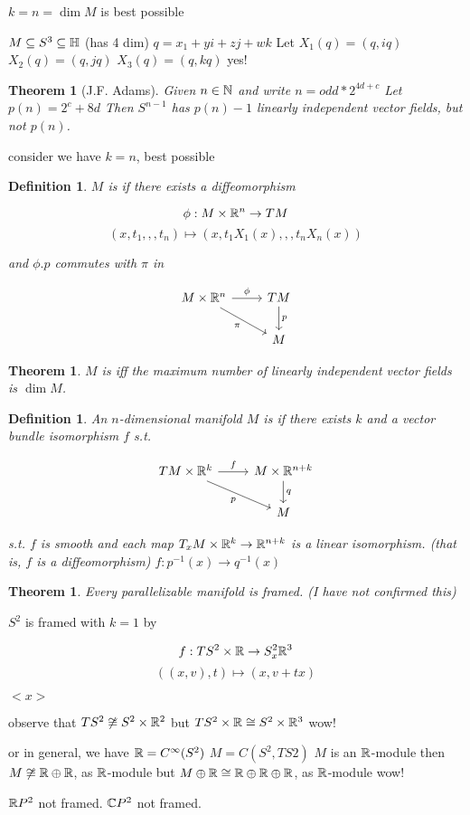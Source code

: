 \documentclass[11pt]{amsbook}
\theoremstyle{mystyle} \newtheorem{thrm}[thm]{Theorem}
\theoremstyle{mystyle} \newtheorem{defi}[thm]{Definition}
\theoremstyle{mystyle} \newtheorem{coro}[thm]{Corollary}
\theoremstyle{mystyle} \newtheorem{propo}[thm]{Proposition}
\theoremstyle{mystyle} \newtheorem{lemm}[thm]{Lemma}
\numberwithin{thm}{section}
\newcommand{\x}{\times}
\begin{document}
$k = n = \dim M$ is best possible

\begin{example}
	$M \subseteq S^3 \subseteq {\mathbb H}$ (has 4 dim)
	$q = x_1 + yi + zj + wk$
	Let
	$X_1(q) = (q, iq)$
	$X_2(q) = (q, jq)$
	$X_3(q) = (q, kq)$
	yes!
\end{example}
\begin{thrm}[J.F. Adams]
	Given $n \in {\mathbb N}$ and write $n = odd*2^{4d+c}$
	Let $p(n) = 2^c + 8d$
	Then $S^{n-1}$ has $p(n)-1$ linearly independent vector fields, but not $p(n)$.
\end{thrm}

consider we have $k = n$, best possible


\begin{defi}
	$M$ is  if there exists a diffeomorphism

	$$\phi : M \x \R^n \to TM$$
	$$(x, t_1,,,t_n) \mapsto (x, t_1X_1(x),,,t_nX_n(x))$$

	and $\phi.p$ commutes with $\pi$ in

	$$\begin{tikzcd}
		M \x \R^n \arrow[r, "\phi"] \arrow[rd, "\pi"'] & TM \arrow[d, "p"] \\
		 & M
	\end{tikzcd}$$

\end{defi}
\begin{thrm}
	$M$ is  iff the maximum number of linearly independent vector fields is $\dim M$.
\end{thrm}
\begin{defi}
	An $n$-dimensional manifold $M$ is  if there exists $k$ and a vector bundle isomorphism $f$ s.t.

	$$\begin{tikzcd}
		TM \x \R^k \arrow[r, "f"] \arrow[rd, "p"'] & M \x \R^{n+k} \arrow[d, "q"] \\
				   & M
	\end{tikzcd}$$

	s.t. $f$ is smooth and each map $T_xM \x \R^k \to \R^{n+k}$ is a linear isomorphism. (that is, $f$ is a diffeomorphism)
	$f: p^{-1}(x) \to q^{-1}(x)$
\end{defi}
\begin{thrm}
	Every parallelizable manifold is framed. (I have not confirmed this)
\end{thrm}
\begin{example}
	$S^2$ is framed with $k=1$ by

	$$f : TS^2 \x \R \to S^2_x \R^3$$
	$$((x,v), t) \mapsto (x, v + tx)$$

	$<x>$

	observe that
	$TS^2 \not\isom S^2 \x \R^2$
	but
	$TS^2 \x \R \isom S^2 \x \R^3$
	wow!

	or in general, we have
	${\mathbb R} = C^\infty(S^2)$
	$M = C(S^2, TS2)$
	$M$ is an ${\mathbb R}$-module
	then
	$M \not\mathrel{\cong} {\mathbb R} \oplus {\mathbb R}$, as ${\mathbb R}$-module
	but
	$M \oplus {\mathbb R} \mathrel{\cong} {\mathbb R} \oplus {\mathbb R} \oplus {\mathbb R}$, as ${\mathbb R}$-module
	wow!
\end{example}
\begin{example}
	${\mathbb R} P^2$ not framed.
	${\mathbb C} P^2$ not framed.
\end{example}
\end{document}
